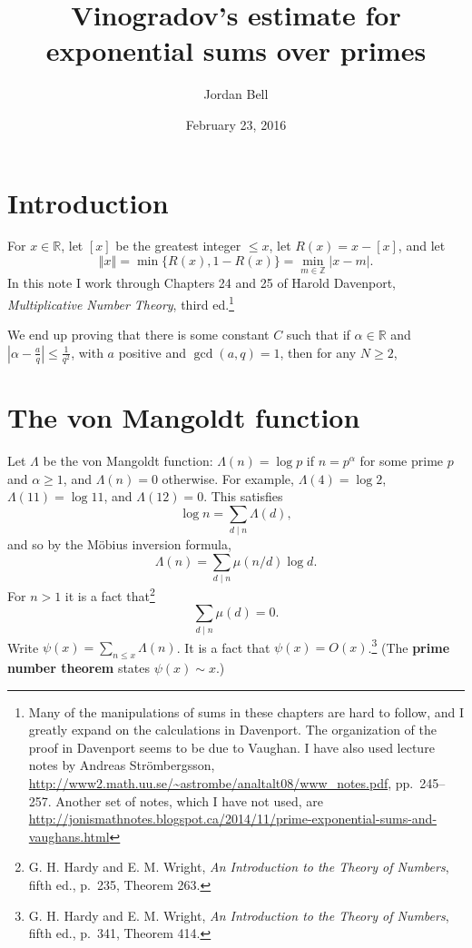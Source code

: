 \documentclass{article}
\newcommand{\norm}[1]{\left\Vert #1 \right\Vert}
\theoremstyle{definition}
\begin{document}
\title{Vinogradov's estimate for exponential sums over primes}
\author{Jordan Bell}
\date{February 23, 2016}

\maketitle

\section{Introduction}
For $x \in \mathbb{R}$, let $[x]$ be the greatest integer $\leq x$, let $R(x)=x-[x]$, and let
\[
\norm{x} = \min\{R(x),1-R(x)\} = \min_{m \in \mathbb{Z}} |x-m|.
\]
In this note I work through Chapters 24 and 25 of Harold Davenport, {\em Multiplicative Number Theory}, third ed.\footnote{Many of the manipulations of sums in these chapters are hard to follow, and I greatly expand on the calculations in
Davenport. The organization of the proof in Davenport seems to be due to Vaughan. I have also used lecture notes by
Andreas Str\"ombergsson,
\url{http://www2.math.uu.se/~astrombe/analtalt08/www_notes.pdf}, pp.~245--257. Another set of notes, which I have not used, are \url{http://jonismathnotes.blogspot.ca/2014/11/prime-exponential-sums-and-vaughans.html}}

We end up proving that there is some constant $C$ such that if $\alpha \in \mathbb{R}$ and $\left|\alpha - \frac{a}{q} \right| \leq
\frac{1}{q^2}$, with $a$ positive and $\gcd(a,q)=1$, then for any $N \geq 2$, 




\section{The von Mangoldt function}
Let $\Lambda$ be the von Mangoldt function: $\Lambda(n)=\log p$ if $n=p^\alpha$ for some prime $p$ and 
$\alpha \geq 1$, and $\Lambda(n)=0$ otherwise. For example, $\Lambda(4)=\log 2$, $\Lambda(11)=\log 11$,
and $\Lambda(12)=0$. This satisfies
\[
\log n = \sum_{d \mid n} \Lambda(d),
\]
and so by the M\"obius inversion formula,
\[
\Lambda(n) = \sum_{d \mid n} \mu(n/d) \log d.
\]
For $n>1$ it is a fact that\footnote{G. H. Hardy and E. M. Wright, {\em An Introduction to the Theory of Numbers},
fifth ed., p.~235, Theorem 263.}
\[
\sum_{d \mid n} \mu(d) = 0.
\]
Write $\psi(x) = \sum_{n \leq x} \Lambda(n)$. It is a fact that
$\psi(x) = O(x)$.\footnote{G. H. Hardy and E. M. Wright, {\em An Introduction to the Theory of Numbers},
fifth ed., p.~341, Theorem 414.} (The \textbf{prime number theorem} states $\psi(x) \sim x$.)
\end{document}
